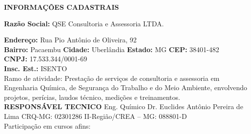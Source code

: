 
\newpage
\begin{center}
\textbf{INFORMAÇÕES CADASTRAIS}
\end{center}
\begin{SingleSpace}

\textbf{Razão Social:} QSE Consultoria e Assessoria LTDA. 

\textbf{Endereço:} Rua Pio Antônio de Oliveira, 92 \\

\textbf{Bairro:} Pacaembu \textbf{Cidade:} Uberlândia \textbf{Estado:} MG \textbf{CEP:} 38401-482 \\

\textbf{CNPJ:} 17.533.344/0001-69 \\

\textbf{Insc. Est.:} ISENTO \\

Ramo de atividade: Prestação de serviços de consultoria e assessoria em Engenharia Química, de Segurança do Trabalho e do Meio Ambiente, envolvendo projetos, perícias, laudos técnico, medições e treinamentos. \\

\textbf{RESPONSÁVEL TECNICO}
Eng. Químico Dr. Euclides Antônio Pereira de Lima CRQ-MG: 02301286 II-Região/CREA – MG: 088801-D \\

Participação em cursos afins:


\end{SingleSpace}

